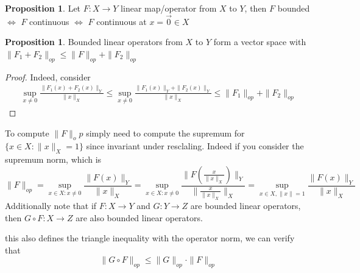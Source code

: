 \documentclass[13pt]{article}
\theoremstyle{definition} --- default
\newtheorem{proposition}[theorem]{Proposition}
\theoremstyle{definition}
\theoremstyle{remark}
\begin{document}
	\begin{proposition}
		Let $F \colon X \to Y$ linear map/operator from $X$ to $Y$, then $F$ bounded $\iff$ $F$ continuous $\iff$ $F$ continuous at $x = \vec{0} \in X$

	\end{proposition}
	\begin{proposition}
		Bounded linear operators from $X$ to $Y$ form a vector space with $\|F_1 + F_2\|_{op} \leq \|F\|_{op} + \|F_2\|_{op}$
	\end{proposition}
	\begin{proof}
		Indeed, consider
		\begin{align*}
			\sup_{x \neq 0} \frac{\|F_1(x) + F_2(x)\|_Y}{\|x\|_X} \leq \sup_{x \neq 0} \frac{\|F_1(x)\|_Y + \|F_2(x)\|_Y}{\|x\|_X} \leq \|F_1\|_{op} + \|F_2\|_{op}
		\end{align*}
	\end{proof}
	To compute $\|F\|_op$ simply need to compute the supremum for $\{x \in X \colon \|x\|_X = 1\}$ since invariant under resclaling. Indeed if you consider the supremum norm, which is 
	$$
	\|F\|_{op} = \sup_{x \in X \colon x \neq 0} \frac{\|F(x)\|_Y}{\|x\|_X} = \sup_{x \in X \colon x \neq 0} \frac{\|F\left(\frac{ x }{ \|x\|_X}\right)\|_Y}{ \|\frac{ x }{ \|x\|_X} \|_X} = \sup_{x \in X, \|x\| = 1} \frac{\|F(x)\|_Y}{\|x\|_X} 
	$$
	Additionally note that if $F \colon X \to Y$ and $G \colon Y \to Z$ are bounded linear operators, then $G \circ F \colon X \to Z$ are also bounded linear operators. 

	this also defines the triangle inequality with the operator norm, we can verify that
	$$ \| G \circ F\|_{op} \leq \|G\|_{op} \cdot \|F\|_{op}$$
\end{document}
